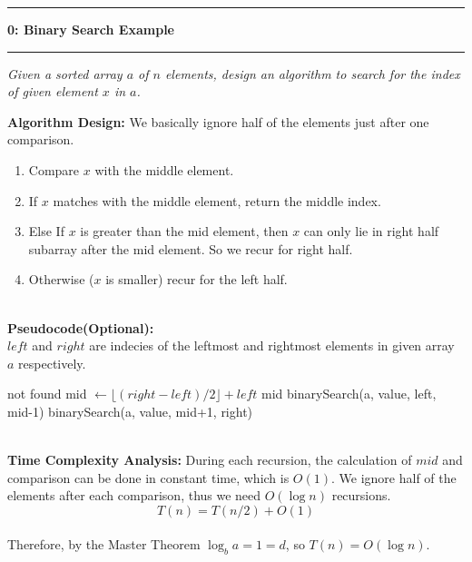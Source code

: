 \documentclass[10.5pt]{article}
\newcommand\question[2]{\vspace{.25in}\hrule\textbf{#1: #2}\vspace{.5em}\hrule\vspace{.10in}}
\begin{document}
\newpage
\noindent
\question{0}{Binary Search Example}

\textit{Given a sorted array $a$ of $n$ elements, design an algorithm to search for the index of given element $x$ in $a$.\\}

\vspace{1em}
\noindent
\textbf{Algorithm Design:}
We basically ignore half of the elements just after one comparison.\\
\begin{enumerate}
	\item Compare $x$ with the middle element.
	\item If $x$ matches with the middle element, return the middle index.
	\item Else If $x$ is greater than the mid element, then $x$ can only lie in right half subarray after the mid element. So we recur for right half.
	\item Otherwise ($x$ is smaller) recur for the left half.
\end{enumerate}

~\\

\textbf{Pseudocode(Optional):}\\
$left$ and $right$ are indecies of the leftmost and rightmost elements in given array $a$ respectively.
\begin{algorithm}[H]
	\begin{algorithmic}[1]
		\State \Return not found
		\EndIf
		\State mid $\gets \lfloor (right-left)/2 \rfloor + left$
		\State \Return mid
		\EndIf
		\State \Return binarySearch(a, value, left, mid-1)
		\Else
		\State \Return binarySearch(a, value, mid+1, right) 
		\EndIf   		
		\EndFunction
	\end{algorithmic}
\end{algorithm}

~\\

\textbf{Time Complexity Analysis:}
During each recursion, the calculation of $mid$ and comparison can be done in constant time, which is $O(1)$. We ignore half of the elements after each comparison, thus we need $O(\log n)$ recursions.
$$T(n) = T(n/2)+O(1)$$\\
Therefore, by the Master Theorem $\log_{b}{a}=1=d$, so $T(n) = O(\log n)$.

\newpage
\end{document}
